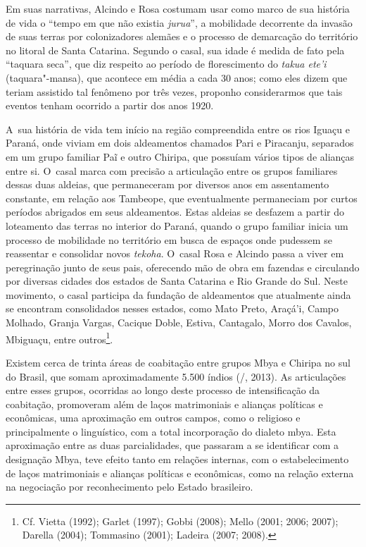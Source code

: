 Em suas narrativas, Alcindo e Rosa costumam usar como marco de sua
história de vida o ``tempo em que não existia \emph{jurua}'', a mobilidade
decorrente da invasão de suas terras por colonizadores alemães e o
processo de demarcação do território no litoral de Santa Catarina.
Segundo o casal, sua idade é medida de fato pela ``taquara seca'',
que diz respeito ao período de florescimento do \emph{takua ete’i}
(taquara"-mansa), que acontece em média a cada 30 anos; como eles dizem
que teriam assistido tal fenômeno por três vezes, proponho
considerarmos que tais eventos tenham ocorrido a partir dos anos 1920.

A~sua história de vida tem início na região compreendida entre os rios
Iguaçu e Paraná, onde viviam em dois aldeamentos chamados Pari e
Piracanju, separados em um grupo familiar Paĩ e
outro Chiripa, que possuíam vários tipos de alianças entre si. O~casal
marca com precisão a articulação entre os grupos familiares dessas duas
aldeias, que permaneceram por diversos anos em assentamento constante,
em relação aos Tambeope, que eventualmente permaneciam por curtos
períodos abrigados em seus aldeamentos. Estas aldeias se desfazem a
partir do loteamento das terras no interior do Paraná, quando o grupo
familiar inicia um processo de mobilidade no território em busca de
espaços onde pudessem se reassentar e consolidar novos \emph{tekoha}. O~casal
Rosa e Alcindo passa a viver em peregrinação junto de seus pais,
oferecendo mão de obra em fazendas e circulando por diversas cidades
dos estados de Santa Catarina e Rio Grande do Sul. Neste movimento, o
casal participa da fundação de aldeamentos que atualmente ainda se
encontram consolidados nesses estados, como Mato Preto, Araçá’i, Campo
Molhado, Granja Vargas, Cacique Doble, Estiva, Cantagalo, Morro dos
Cavalos, Mbiguaçu, entre outros\footnote{Cf. Vietta (1992); Garlet
(1997); Gobbi (2008); Mello (2001; 2006; 2007); Darella (2004);
Tommasino (2001); Ladeira (2007; 2008).}.

Existem cerca de trinta áreas de coabitação entre grupos Mbya e Chiripa
no sul do Brasil, que somam aproximadamente 5.500 índios (/,
2013). As articulações entre esses grupos, ocorridas ao longo deste processo
de intensificação da coabitação, promoveram além de laços matrimoniais
e alianças políticas e econômicas, uma aproximação em outros campos,
como o religioso e principalmente o linguístico, com a total
incorporação do dialeto mbya. Esta aproximação entre as duas
parcialidades, que passaram a se identificar com a designação Mbya,
teve efeito tanto em relações internas, com o estabelecimento de laços
matrimoniais e alianças políticas e econômicas, como na relação externa
na negociação por reconhecimento pelo Estado brasileiro.

